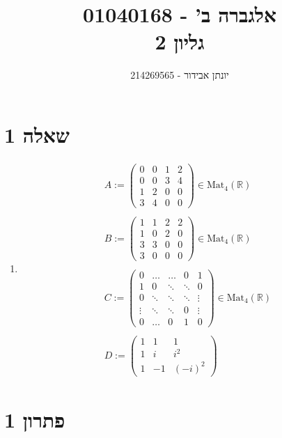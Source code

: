 \documentclass[12pt, titlepage]{article}
\title{אלגברה ב' - 01040168 \\ גליון 2}
\author{יונתן אבידור - 214269565}
\begin{document}
\maketitle
\pagestyle{fancy}
\fancyhead{}
\part*{שאלה 1}
\begin{enumerate}
 \item   \begin{gather*}
        A:= \begin{pmatrix}
            0 & 0 & 1 & 2 \\
            0 & 0 & 3 & 4 \\
            1 & 2 & 0 & 0 \\
            3 & 4 & 0 & 0
    \end{pmatrix} \in \mathrm{Mat}_4\left(\mathbb{R}\right) \\  \\
        B:= \begin{pmatrix}
            1 & 1 & 2 & 2 \\
            1 & 0 & 2 & 0 \\
            3 & 3 & 0 & 0 \\
            3 & 0 & 0 & 0
    \end{pmatrix} \in \mathrm{Mat}_4\left(\mathbb{R}\right) \\ \\
C := \begin{pmatrix}
    0 & \dots & \dots & 0 & 1\\
    1 & 0 & \ddots & \ddots & 0 \\
    0 & \ddots & \ddots & \ddots & \vdots \\
    \vdots & \ddots & \ddots & 0 & \vdots \\
    0 & \dots & 0 & 1 & 0
\end{pmatrix}\in \mathrm{Mat}_4\left(\mathbb{R}\right) \\ \\
D := \begin{pmatrix}
    1 & 1 & 1 \\
    1 & i & i^2 \\
    1 & -1 & \left(-i\right)^2
\end{pmatrix}
    \end{gather*}
\end{enumerate}
\part*{פתרון 1}
\end{document}
